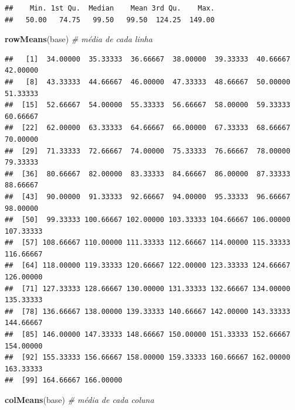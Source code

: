 \documentclass[
]{article}
\newenvironment{Shaded}{\begin{snugshade}}{\end{snugshade}}
\newcommand{\CommentTok}[1]{\textcolor[rgb]{0.56,0.35,0.01}{\textit{#1}}}
\newcommand{\KeywordTok}[1]{\textcolor[rgb]{0.13,0.29,0.53}{\textbf{#1}}}
\newcommand{\NormalTok}[1]{#1}
\newcommand{\OperatorTok}[1]{\textcolor[rgb]{0.81,0.36,0.00}{\textbf{#1}}}
\begin{document}
\begin{Shaded}
\end{Shaded}

\begin{verbatim}
##    Min. 1st Qu.  Median    Mean 3rd Qu.    Max. 
##   50.00   74.75   99.50   99.50  124.25  149.00
\end{verbatim}

\begin{Shaded}
\begin{Highlighting}[]
\KeywordTok{rowMeans}\NormalTok{(base) }\CommentTok{# média de cada linha}
\end{Highlighting}
\end{Shaded}

\begin{verbatim}
##   [1]  34.00000  35.33333  36.66667  38.00000  39.33333  40.66667  42.00000
##   [8]  43.33333  44.66667  46.00000  47.33333  48.66667  50.00000  51.33333
##  [15]  52.66667  54.00000  55.33333  56.66667  58.00000  59.33333  60.66667
##  [22]  62.00000  63.33333  64.66667  66.00000  67.33333  68.66667  70.00000
##  [29]  71.33333  72.66667  74.00000  75.33333  76.66667  78.00000  79.33333
##  [36]  80.66667  82.00000  83.33333  84.66667  86.00000  87.33333  88.66667
##  [43]  90.00000  91.33333  92.66667  94.00000  95.33333  96.66667  98.00000
##  [50]  99.33333 100.66667 102.00000 103.33333 104.66667 106.00000 107.33333
##  [57] 108.66667 110.00000 111.33333 112.66667 114.00000 115.33333 116.66667
##  [64] 118.00000 119.33333 120.66667 122.00000 123.33333 124.66667 126.00000
##  [71] 127.33333 128.66667 130.00000 131.33333 132.66667 134.00000 135.33333
##  [78] 136.66667 138.00000 139.33333 140.66667 142.00000 143.33333 144.66667
##  [85] 146.00000 147.33333 148.66667 150.00000 151.33333 152.66667 154.00000
##  [92] 155.33333 156.66667 158.00000 159.33333 160.66667 162.00000 163.33333
##  [99] 164.66667 166.00000
\end{verbatim}

\begin{Shaded}
\begin{Highlighting}[]
\KeywordTok{colMeans}\NormalTok{(base) }\CommentTok{# média de cada coluna}
\end{Highlighting}
\end{Shaded}
\end{document}
